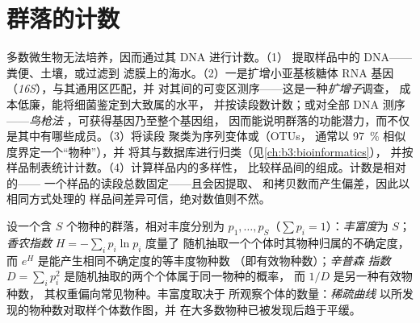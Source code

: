 \section{群落的计数}

\begin{method}[通过测序分析微生物组]\label{met:b3:microbiomes:16s}
多数微生物无法培养，因而通过其 DNA 进行计数。（1）
提取样品中的 DNA——粪便、土壤，或过滤到
滤膜上的海水。（2）一是扩增小亚基核糖体
RNA 基因（\emph{16S}），与其通用区匹配，并
对其间的可变区测序——这是一种\emph{扩增子}调查，
成本低廉，能将细菌鉴定到大致属的水平，
并按读段数计数；或对全部 DNA 测序——\emph{鸟枪法
}，可获得基因乃至整个基因组，
因而能说明群落的功能潜力，而不仅是其中有哪些成员。（3）将读段
聚类为序列变体或\emph{}（OTUs，
通常以 \qty{97}{\%} 相似度界定一个“物种”），并
将其与数据库进行归类（见\cref{ch:b3:bioinformatics}），
并按样品制表统计计数。（4）计算样品内的多样性，
比较样品间的组成。计数是相对的——
一个样品的读段总数固定——且会因提取、
和拷贝数而产生偏差，因此以相同方式处理的
样品间差异可信，绝对数值则不然。
\end{method}

\begin{definition}[多样性]\label{def:b3:microbiomes:diversity}
设一个含 $S$ 个物种的群落，相对丰度分别为 $p_{1},\dots,
p_{S}$（$\sum p_{i} = 1$）：\emph{丰富度}为 $S$；
\emph{香农指数} $H = -\sum_{i} p_{i}\ln p_{i}$ 度量了
随机抽取一个个体时其物种归属的不确定度，而
$e^{H}$ 是能产生相同不确定度的等丰度物种数
（即有效物种数）；\emph{辛普森
指数} $D = \sum_{i} p_{i}^{2}$ 是随机抽取的两个个体属于同一物种的概率，
而 $1/D$ 是另一种有效物种数，
其权重偏向常见物种。丰富度取决于
所观察个体的数量：\emph{稀疏曲线}
以所发现的物种数对取样个体数作图，并
在大多数物种已被发现后趋于平缓。
\end{definition}

